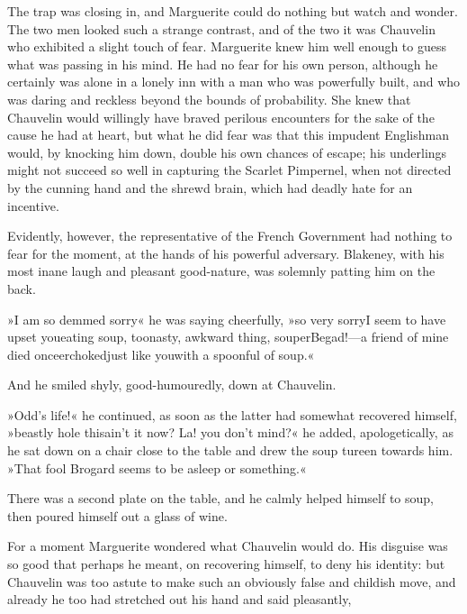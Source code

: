 The trap was closing in, and Marguerite could do nothing but watch and wonder. The two men looked such a strange contrast, and of the two it was Chauvelin who exhibited a slight touch of fear. Marguerite knew him well enough to guess what was passing in his mind. He had no fear for his own person, although he certainly was alone in a lonely inn with a man who was powerfully built, and who was daring and reckless beyond the bounds of probability. She knew that Chauvelin would willingly have braved perilous encounters for the sake of the cause he had at heart, but what he did fear was that this impudent Englishman would, by knocking him down, double his own chances of escape; his underlings might not succeed so well in capturing the Scarlet Pimpernel, when not directed by the cunning hand and the shrewd brain, which had deadly hate for an incentive.

Evidently, however, the representative of the French Government had nothing to fear for the moment, at the hands of his powerful adversary. Blakeney, with his most inane laugh and pleasant good-nature, was solemnly patting him on the back.

»I am so demmed sorry\textellipsis« he was saying cheerfully, »so very sorry\textellipsis \allowbreak  I seem to have upset you\textellipsis \allowbreak  eating soup, too\textellipsis \allowbreak  nasty, awkward thing, soup\textellipsis \allowbreak  er\textellipsis \allowbreak  Begad!—a friend of mine died once\textellipsis \allowbreak  er\textellipsis \allowbreak  choked\textellipsis \allowbreak  just like you\textellipsis \allowbreak  with a spoonful of soup.«

And he smiled shyly, good-humouredly, down at Chauvelin.

»Odd's life!« he continued, as soon as the latter had somewhat recovered himself, »beastly hole this\textellipsis \allowbreak  ain't it now? La! you don't mind?« he added, apologetically, as he sat down on a chair close to the table and drew the soup tureen towards him. »That fool Brogard seems to be asleep or something.«

There was a second plate on the table, and he calmly helped himself to soup, then poured himself out a glass of wine.

For a moment Marguerite wondered what Chauvelin would do. His disguise was so good that perhaps he meant, on recovering himself, to deny his identity: but Chauvelin was too astute to make such an obviously false and childish move, and already he too had stretched out his hand and said pleasantly,\longdash


